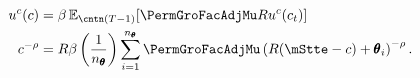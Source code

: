   \begin{equation}\begin{gathered}\begin{aligned}
        \uFunc^{{c}}(\cNrm)       & = \DiscFac \Ex_{\cntn(T-1)} [\PermGroFacAdjMu\Rfree \uFunc^{{c}}({c}_{\prdT})]  %
        \\      \cNrm^{-\CRRA}   & = \Rfree \DiscFac \left(\frac{1}{n_{\TranShkEmp}}\right) \sum_{i=1}^{n_{\TranShkEmp}} \PermGroFacAdjMu\left(\Rfree (\mStte-\cNrm) + \TranShkEmp_{i}\right)^{-\CRRA} \label{eq:FOCTm1}.
      \end{aligned}\end{gathered}\end{equation}
